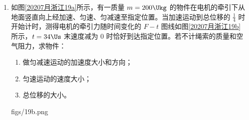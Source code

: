 \documentclass[\gkver]{gaokaozhenti}
\begin{document}
\begin{enumerate}
{（2）一节干电池的电动势一般约为 $1.5\UV$，故电压表量程选择 $0\sim3\UV$，电流表量程选择 $0\sim0.6\UA$，所以量表的读数分别为 $1.30\UV$（$1.29\sim1.31\UV$ 均可），$0.40\UA$（$0.39\sim0.41\UA$ 均可）。

（3）由闭合电路欧姆定律可得 $U=E-Ir$，可得 $U-I$ 图象的纵轴截距为电源电动势，斜率为电源内阻。图甲中电流表外接，则实验测得的电源内阻 $r_{\text{测}}=r_{\text{内}}+r_{A}$，测量值偏大；图乙中电路 $r_{\text{测}}=\frac{r_{V}}{r_{\text{内}}+r_{V}}r_{\text{内}}$，测量值偏小，但是由于 $R_{V}\gg r_{\text{真}}$，故图乙实验测出的内阻误差更小，故图线Ⅰ对应图乙，图线Ⅱ对应的图甲。

（4）图线Ⅱ与纵轴的交点为电源的电动势 $E=1.52\UV$；在图线Ⅰ与横轴的交点为短路电流 $I=2.86\UA$。由 $r=\frac{E}{I}=\frac{1.52\UV}{2.86\UA}=0.53\UO$，此实验原理无误差。
}

\item
如图\ref{20207月浙江19a}所示，有一质量 $m=200\Ukg$ 的物件在电机的牵引下从地面竖直向上经加速、匀速、匀减速至指定位置。当加速运动到总位移的 $\frac{1}{4}$ 时开始计时，测得电机的牵引力随时间变化的 $F-t$ 图线如图\ref{20207月浙江19b}所示，$t=34\Us$ 末速度减为 0 时恰好到达指定位置。若不计绳索的质量和空气阻力，求物件：
\begin{enumerate}
	\item
	做匀减速运动的加速度大小和方向；
	\item
	匀速运动的速度大小；
	\item
	总位移的大小。
\end{enumerate}

{figs/19b.png}
\end{enumerate}
\end{document}
